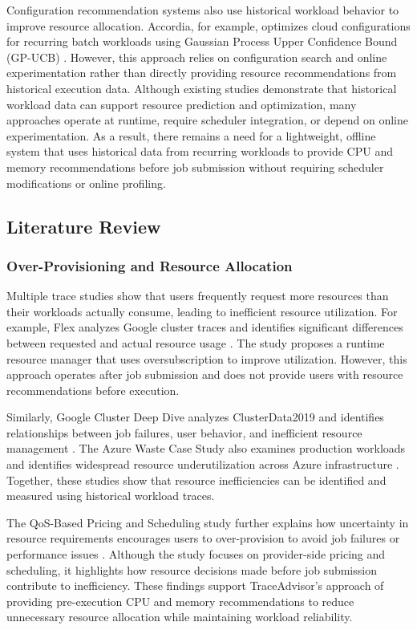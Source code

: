 \documentclass{IEEEtran}
\begin{document}
Configuration recommendation systems also use historical workload behavior to improve resource allocation. Accordia, for example, optimizes cloud configurations for recurring batch workloads using Gaussian Process Upper Confidence Bound (GP-UCB) \cite{ref03}. However, this approach relies on configuration search and online experimentation rather than directly providing resource recommendations from historical execution data. Although existing studies demonstrate that historical workload data can support resource prediction and optimization, many approaches operate at runtime, require scheduler integration, or depend on online experimentation. As a result, there remains a need for a lightweight, offline system that uses historical data from recurring workloads to provide CPU and memory recommendations before job submission without requiring scheduler modifications or online profiling.


\subsection{Literature Review}


\subsubsection{Over-Provisioning and Resource Allocation}

Multiple trace studies show that users frequently request more resources than their workloads actually consume, leading to inefficient resource utilization. For example, Flex analyzes Google cluster traces and identifies significant differences between requested and actual resource usage \cite{ref01}. The study proposes a runtime resource manager that uses oversubscription to improve utilization. However, this approach operates after job submission and does not provide users with resource recommendations before execution.

Similarly, Google Cluster Deep Dive analyzes ClusterData2019 and identifies relationships between job failures, user behavior, and inefficient resource management \cite{ref05}. The Azure Waste Case Study also examines production workloads and identifies widespread resource underutilization across Azure infrastructure \cite{ref06}. Together, these studies show that resource inefficiencies can be identified and measured using historical workload traces.

The QoS-Based Pricing and Scheduling study further explains how uncertainty in resource requirements encourages users to over-provision to avoid job failures or performance issues \cite{ref04}. Although the study focuses on provider-side pricing and scheduling, it highlights how resource decisions made before job submission contribute to inefficiency. These findings support TraceAdvisor's approach of providing pre-execution CPU and memory recommendations to reduce unnecessary resource allocation while maintaining workload reliability.
\end{document}
